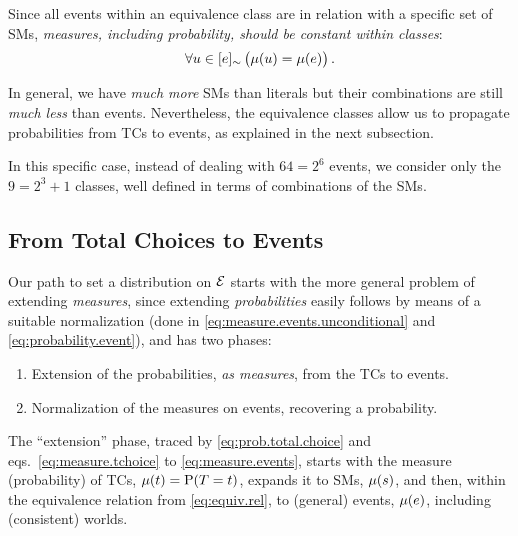 \documentclass{llncs}
\newcommand{\at}[1]{\ensuremath{\!\del{#1}}}
\newcommand{\fml}[1]{\ensuremath{{\cal #1}}}
\newcommand{\pr}[1]{\ensuremath{\mathrm{P}\at{#1}}}
\newcommand{\pw}[1]{\ensuremath{\mu\at{#1}}}
\newcommand{\class}[1]{\ensuremath{[{#1}]_{\sim}}}
\begin{document}
 Since all events within an equivalence class are in relation with a specific set of \aclp{SM}, \emph{measures, including probability, should be constant within classes}:
          \[
              \forall u\in \class{e} \left(\mu\at{u} = \mu\at{e} \right).
          \]
          
     In general, we have \emph{much more} \aclp{SM} than literals but their combinations are still \emph{much less} than events. Nevertheless, the equivalence classes allow us to propagate probabilities from \aclp{TC} to events, as explained in the next subsection.
          
    In this specific case, instead of dealing with $64 = 2^6$ events, we consider only the $9 = 2^3 + 1$ classes, well defined in terms of combinations of the \aclp{SM}.

%
%
%
\subsection{From Total Choices to Events}\label{subsec:from.tchoices.to.events}
%
%
%
Our path to set a distribution on $\fml{E}$ starts with the more general problem of extending \emph{measures}, since extending \emph{probabilities} easily follows by means of a suitable normalization (done in \eqref{eq:measure.events.unconditional} and \eqref{eq:probability.event}), and has two phases:
\begin{enumerate}
    \item Extension of the probabilities, \emph{as measures}, from the \aclp{TC} to events.
    \item Normalization of the measures on events, recovering a probability.
\end{enumerate}

The ``extension'' phase, traced by \cref{eq:prob.total.choice} and eqs.\ \eqref{eq:measure.tchoice} to \eqref{eq:measure.events}, starts with the measure (probability) of \aclp{TC}, $\pw{t} = \pr{T = t}$, expands it to \aclp{SM}, $\pw{s}$, and then, within the equivalence relation from \cref{eq:equiv.rel}, to (general) events, $\pw{e}$, including (consistent) worlds.
\end{document}

